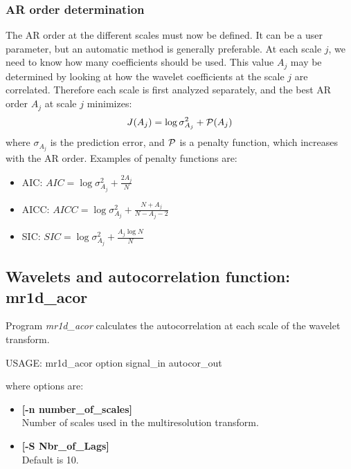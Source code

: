 \subsubsection{AR order determination}
The AR order at the different scales must now be defined. 
It can be a user parameter,
but an automatic method is generally preferable. At each scale $j$, 
we need to know how many coefficients should be used. This value $A_j$
may be determined by looking at how the wavelet coefficients at the
scale $j$ are correlated. Therefore each scale is first analyzed separately,
and the best AR order $A_j$ at scale $j$ minimizes:
\begin{eqnarray*}
J(A_j) = \log \sigma_{A_j}^2 + {\cal P}(A_j)
\end{eqnarray*}
where $\sigma_{A_j}$ is the prediction error, and
${\cal P}$ is a penalty function, which increases with the AR order.
Examples of penalty functions are:
\begin{itemize}
\item AIC: $AIC = \log \sigma_{A_j}^2 + \frac{2 A_j}{N}$ 
\item AICC: $AICC = \log \sigma_{A_j}^2 + \frac{N +  A_j}{N - A_j - 2}$
\item SIC: $SIC = \log \sigma_{A_j}^2 + \frac{ A_j\log N }{N}$
\end{itemize}


\subsection{Wavelets and autocorrelation function: mr1d\_acor}
Program {\em mr1d\_acor} calculates the autocorrelation at each scale
of the wavelet transform. 
{\bf
\begin{center}
 USAGE: mr1d\_acor option signal\_in autocor\_out
\end{center}}
where options are:
\begin{itemize}
\baselineskip=0.4truecm
\item {\bf [-n number\_of\_scales]} \\
Number of scales used in the multiresolution transform.
\item {\bf [-S Nbr\_of\_Lags]} \\
Default is 10.
\end{itemize}

